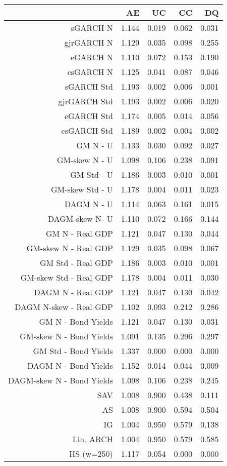 \documentclass{article}
\begin{document}


\begin{table}[ht]
\centering
\begin{tabular}{rrrrr}
  \hline
 & AE & UC & CC & DQ \\ 
  \hline
sGARCH N & 1.144 & 0.019 & 0.062 & 0.031 \\ 
  gjrGARCH N & 1.129 & 0.035 & 0.098 & 0.255 \\ 
  eGARCH N & 1.110 & 0.072 & 0.153 & 0.190 \\ 
  csGARCH N & 1.125 & 0.041 & 0.087 & 0.046 \\ 
  sGARCH Std & 1.193 & 0.002 & 0.006 & 0.001 \\ 
  gjrGARCH Std & 1.193 & 0.002 & 0.006 & 0.020 \\ 
  eGARCH Std & 1.174 & 0.005 & 0.014 & 0.056 \\ 
  csGARCH Std & 1.189 & 0.002 & 0.004 & 0.002 \\ 
  GM N - U & 1.133 & 0.030 & 0.092 & 0.027 \\ 
  GM-skew N - U & 1.098 & 0.106 & 0.238 & 0.091 \\ 
  GM Std - U & 1.186 & 0.003 & 0.010 & 0.001 \\ 
  GM-skew Std - U & 1.178 & 0.004 & 0.011 & 0.023 \\ 
  DAGM N - U & 1.114 & 0.063 & 0.161 & 0.015 \\ 
  DAGM-skew  N- U & 1.110 & 0.072 & 0.166 & 0.144 \\ 
  GM N - Real GDP & 1.121 & 0.047 & 0.130 & 0.044 \\ 
  GM-skew N - Real GDP & 1.129 & 0.035 & 0.098 & 0.067 \\ 
  GM Std - Real GDP & 1.186 & 0.003 & 0.010 & 0.001 \\ 
  GM-skew Std - Real GDP & 1.178 & 0.004 & 0.011 & 0.030 \\ 
  DAGM N - Real GDP & 1.121 & 0.047 & 0.130 & 0.042 \\ 
  DAGM N-skew - Real GDP & 1.102 & 0.093 & 0.212 & 0.286 \\ 
  GM N - Bond Yields & 1.121 & 0.047 & 0.130 & 0.031 \\ 
  GM-skew N - Bond Yields & 1.091 & 0.135 & 0.296 & 0.297 \\ 
  GM Std - Bond Yields & 1.337 & 0.000 & 0.000 & 0.000 \\ 
  DAGM N - Bond Yields & 1.152 & 0.014 & 0.044 & 0.009 \\ 
  DAGM-skew N - Bond Yields & 1.098 & 0.106 & 0.238 & 0.245 \\ 
  SAV & 1.008 & 0.900 & 0.438 & 0.111 \\ 
  AS & 1.008 & 0.900 & 0.594 & 0.504 \\ 
  IG & 1.004 & 0.950 & 0.579 & 0.138 \\ 
  Lin. ARCH & 1.004 & 0.950 & 0.579 & 0.585 \\ 
  HS (w=250) & 1.117 & 0.054 & 0.000 & 0.000 \\ 
   \hline
\end{tabular}
\end{table}
\end{document}
